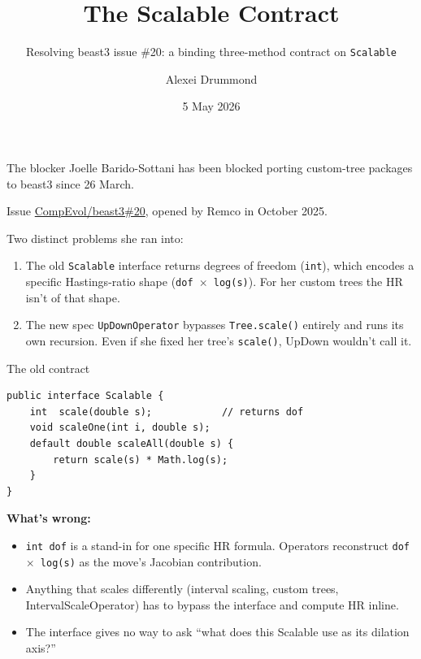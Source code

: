 \documentclass[aspectratio=169,11pt]{beamer}
\title{The Scalable Contract}
\subtitle{Resolving beast3 issue \#20: a binding three-method contract on \texttt{Scalable}}
\author{Alexei Drummond}
\date{5 May 2026}
\newcommand{\code}[1]{\texttt{#1}}
\begin{document}
\begin{frame}
\titlepage
\end{frame}

\begin{frame}{The blocker}
Joelle Barido-Sottani has been blocked porting custom-tree packages to beast3 since 26 March.

\vspace{1em}

Issue \href{https://github.com/CompEvol/beast3/issues/20}{CompEvol/beast3\#20}, opened by Remco in October 2025.

\vspace{1em}

Two distinct problems she ran into:

\begin{enumerate}
\item The old \code{Scalable} interface returns degrees of freedom (\code{int}), which encodes a specific Hastings-ratio shape (\code{dof $\times$ log(s)}).
For her custom trees the HR isn't of that shape.

\item The new spec \code{UpDownOperator} bypasses \code{Tree.scale()} entirely and runs its own recursion.
Even if she fixed her tree's \code{scale()}, UpDown wouldn't call it.
\end{enumerate}
\end{frame}

\begin{frame}[fragile]{The old contract}
\begin{lstlisting}
public interface Scalable {
    int  scale(double s);            // returns dof
    void scaleOne(int i, double s);
    default double scaleAll(double s) {
        return scale(s) * Math.log(s);
    }
}
\end{lstlisting}

\vspace{0.5em}

\textbf{What's wrong:}

\begin{itemize}
\item \code{int dof} is a stand-in for one specific HR formula.
Operators reconstruct \code{dof $\times$ log(s)} as the move's Jacobian contribution.
\item Anything that scales differently (interval scaling, custom trees, IntervalScaleOperator) has to bypass the interface and compute HR inline.
\item The interface gives no way to ask ``what does this Scalable use as its dilation axis?''
\end{itemize}
\end{frame}
\end{document}
